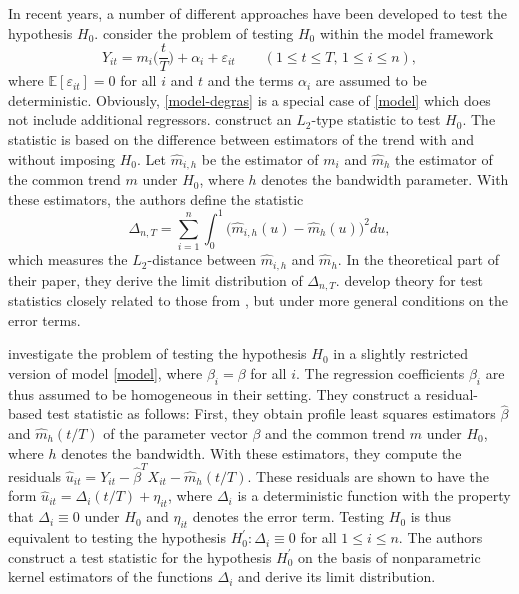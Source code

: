 In recent years, a number of different approaches have been developed to test the hypothesis $H_0$. \cite{DegrasWu2012} consider the problem of testing $H_0$ within the model framework
\begin{equation}\label{model-degras}
Y_{it} = m_i \Big( \frac{t}{T} \Big) + \alpha_i + \varepsilon_{it} \qquad (1 \le t \le T, \, 1 \le i \le n), 
\end{equation}
where $\mathbb{E}[\varepsilon_{it}] = 0$ for all $i$ and $t$ and the terms $\alpha_i$ are assumed to be deterministic. Obviously, \eqref{model-degras} is a special case of \eqref{model} which does not include additional regressors. \cite{DegrasWu2012} construct an $L_2$-type statistic to test $H_0$. The statistic is based on the difference between estimators of the trend with and without imposing $H_0$. Let $\hat{m}_{i,h}$ be the estimator of $m_i$ and $\hat{m}_h$ the estimator of the common trend $m$ under $H_0$, where $h$ denotes the bandwidth parameter. With these estimators, the authors define the statistic
\begin{equation}\label{stat-degras}
\Delta_{n,T} = \sum_{i=1}^n \int_0^1 \big(\hat{m}_{i,h}(u) - \hat{m}_h(u)\big)^2 du, 
\end{equation} 
which measures the $L_2$-distance between $\hat{m}_{i, h}$ and $\hat{m}_h$. In the theoretical part of their paper, they derive the limit distribution of $\Delta_{n,T}$. \cite{ChenWu2018} develop theory for test statistics closely related to those from \cite{DegrasWu2012}, but under more general conditions on the error terms. 


\cite{Zhang2012} investigate the problem of testing the hypothesis $H_0$ in a slightly restricted version of model \eqref{model}, where $\beta_i = \beta$ for all $i$. The regression coefficients $\beta_i$ are thus assumed to be homogeneous in their setting. They construct a residual-based test statistic as follows: First, they obtain profile least squares estimators $\hat{\beta}$ and $\hat{m}_h(t/T)$ of the parameter vector $\beta$ and the common trend $m$ under $H_0$, where $h$ denotes the bandwidth. With these estimators, they compute the residuals $\hat{u}_{it} = Y_{it} - \hat{\beta}^T X_{it} - \hat{m}_h(t/T)$. These residuals are shown to have the form $\hat{u}_{it} = \Delta_i(t/T) + \eta_{it}$, where $\Delta_i$ is a deterministic function with the property that $\Delta_i \equiv 0$ under $H_0$ and $\eta_{it}$ denotes the error term. Testing $H_0$ is thus equivalent to testing the hypothesis $H_0^\prime: \Delta_i \equiv 0$ for all $1 \le i \le n$. The authors construct a test statistic for the hypothesis $H_0^\prime$ on the basis of nonparametric kernel estimators of the functions $\Delta_i$ and derive its limit distribution.  


